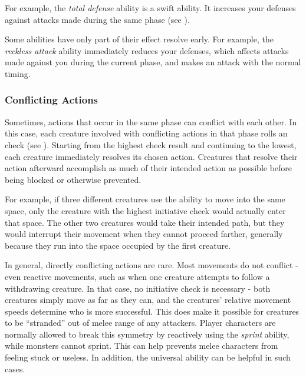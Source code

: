             For example, the \textit{total defense} ability is a swift ability.
            It increases your defenses against attacks made during the same phase (see ).

            Some abilities have only part of their effect resolve early.
            For example, the \textit{reckless attack} ability immediately reduces your defenses, which affects attacks made against you during the current phase, and makes an attack with the normal timing.

        \subsubsection{Conflicting Actions}\label{Conflicting Actions}

            Sometimes, actions that occur in the same phase can conflict with each other.
            In this case, each creature involved with conflicting actions in that phase rolls an  check (see ).
            Starting from the highest check result and continuing to the lowest, each creature immediately resolves its chosen action.
            Creatures that resolve their action afterward accomplish as much of their intended action as possible before being blocked or otherwise prevented.

            For example, if three different creatures use the  ability to move into the same space, only the creature with the highest initiative check would actually enter that space.
            The other two creatures would take their intended path, but they would interrupt their movement when they cannot proceed farther, generally because they run into the space occupied by the first creature.

            In general, directly conflicting actions are rare.
            Most movements do not conflict - even reactive movements, such as when one creature attempts to follow a withdrawing creature.
            In that case, no initiative check is necessary - both creatures simply move as far as they can, and the creatures' relative movement speeds determine who is more successful.
            This does make it possible for creatures to be ``stranded'' out of melee range of any attackers.
            Player characters are normally allowed to break this symmetry by reactively using the \textit{sprint} ability, while monsters cannot sprint.
            This can help prevents melee characters from feeling stuck or useless.
            In addition, the  universal ability can be helpful in such cases.


